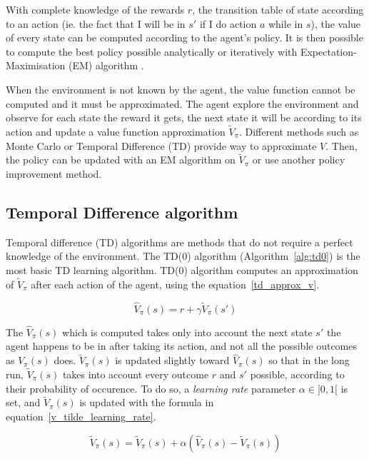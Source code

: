 \documentclass[]{article}
\begin{document}
With complete knowledge of the rewards \(r\), the transition table of state according to an action (ie. the fact that I will be in \(s'\) if I do action \(a\) while in \(s\)), the value of every state can be computed according to the agent's policy. It is then possible to compute the best policy possible analytically or iteratively with Expectation-Maximisation (EM) algorithm \parencite{sutton_reinforcement_1998}.

When the environment is not known by the agent, the value function cannot be computed and it must be approximated. The agent explore the environment and observe for each state the reward it gets, the next state it will be according to its action and update a value function approximation \(\tilde{V}_\pi\). Different methods such as Monte Carlo or Temporal Difference (TD) provide way to approximate \(V\). Then, the policy can be updated with an EM algorithm on \(\tilde{V}_\pi\) or use another policy improvement method.

\subsection{Temporal Difference algorithm}

Temporal difference (TD) algorithms are methods that do not require a perfect knowledge of the environment. The TD(0) algorithm (Algorithm~\ref{alg:td0}) is the most basic TD learning algorithm. TD(0) algorithm computes an approximation of \(\tilde{V}_\pi\) after each action of the agent, using the equation~\ref{td_approx_v}.

\begin{equation}
  \hat{V}_\pi(s) = r + \gamma \tilde{V}_\pi(s')
  \label{td_approx_v}
\end{equation}

The \(\hat{V}_\pi(s)\) which is computed takes only into account the next state \(s'\) the agent happens to be in after taking its action, and not all the possible outcomes as \(V_\pi(s)\) does. \(\tilde{V}_\pi(s)\) is updated slightly toward \(\hat{V}_\pi(s)\) so that in the long run, \(\tilde{V}_\pi(s)\) takes into account every outcome \(r\) and \(s'\) possible, according to their probability of occurence. To do so, a \emph{learning rate} parameter \(\alpha \in ]0, 1[\) is set, and \(\tilde{V}_\pi(s)\) is updated with the formula in equation~\ref{v_tilde_learning_rate}.

\begin{equation}
\tilde{V}_\pi(s) = \tilde{V}_\pi(s) + \alpha (\hat{V}_\pi(s) - \tilde{V}_\pi(s))
\label{v_tilde_learning_rate}
\end{equation}
\end{document}

